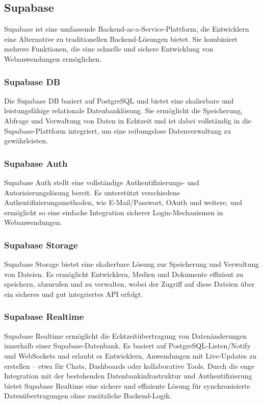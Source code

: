 \begin{inhalt}
\subsection{Supabase}
Supabase \cite{Supabase} ist eine umfassende Backend-as-a-Service-Plattform, die Entwicklern eine Alternative zu traditionellen Backend-Lösungen bietet. Sie kombiniert mehrere Funktionen, die eine schnelle und sichere Entwicklung von Webanwendungen ermöglichen.

\subsubsection{Supabase DB}
Die Supabase DB \cite{SupabaseDB} basiert auf PostgreSQL und bietet eine skalierbare und leistungsfähige relationale Datenbanklösung. Sie ermöglicht die Speicherung, Abfrage und Verwaltung von Daten in Echtzeit und ist dabei vollständig in die Supabase-Plattform integriert, um eine reibungslose Datenverwaltung zu gewährleisten.

\subsubsection{Supabase Auth}
Supabase Auth \cite{SupabaseAuth} stellt eine vollständige Authentifizierungs- und Autorisierungslösung bereit. Es unterstützt verschiedene Authentifizierungsmethoden, wie E-Mail/Passwort, OAuth und weitere, und ermöglicht so eine einfache Integration sicherer Login-Mechanismen in Webanwendungen.

\subsubsection{Supabase Storage}
Supabase Storage \cite{SupabaseStorage} bietet eine skalierbare Lösung zur Speicherung und Verwaltung von Dateien. Es ermöglicht Entwicklern, Medien und Dokumente effizient zu speichern, abzurufen und zu verwalten, wobei der Zugriff auf diese Dateien über ein sicheres und gut integriertes API erfolgt.

\subsubsection{Supabase Realtime}
Supabase Realtime \cite{SupabaseRealtime} ermöglicht die Echtzeitübertragung von Datenänderungen innerhalb einer Supabase-Datenbank. Es basiert auf PostgreSQL-Listen/Notify und WebSockets und erlaubt es Entwicklern, Anwendungen mit Live-Updates zu erstellen – etwa für Chats, Dashboards oder kollaborative Tools. Durch die enge Integration mit der bestehenden Datenbankinfrastruktur und Authentifizierung bietet Supabase Realtime eine sichere und effiziente Lösung für synchronisierte Datenübertragungen ohne zusätzliche Backend-Logik.


\end{inhalt}
